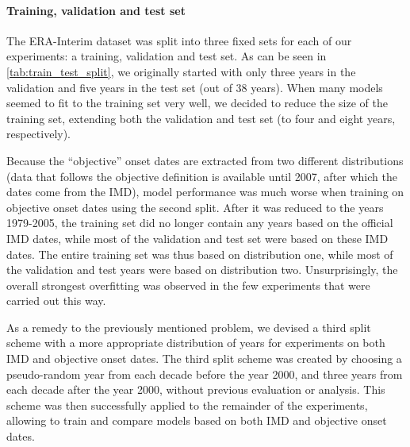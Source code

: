 \paragraph{Training, validation and test set}
The ERA-Interim dataset was split into three fixed sets for each of our experiments: a training, validation and test set. As can be seen in \cref{tab:train_test_split}, we originally started with only three years in the validation and five years in the test set (out of 38 years). When many models seemed to fit to the training set very well, we decided to reduce the size of the training set, extending both the validation and test set (to four and eight years, respectively).

Because the ``objective'' onset dates are extracted from two different distributions (data that follows the objective definition is available until 2007, after which the dates come from the IMD), model performance was much worse when training on objective onset dates using the second split. After it was reduced to the years 1979-2005, the training set did no longer contain any years based on the official IMD dates, while most of the validation and test set were based on these IMD dates. The entire training set was thus based on distribution one, while most of the validation and test years were based on distribution two. Unsurprisingly, the overall strongest overfitting was observed in the few experiments that were carried out this way.

As a remedy to the previously mentioned problem, we devised a third split scheme with a more appropriate distribution of years for experiments on both IMD and objective onset dates. The third split scheme was created by choosing a pseudo-random year from each decade before the year 2000, and three years from each decade after the year 2000, without previous evaluation or analysis. This scheme was then successfully applied to the remainder of the experiments, allowing to train and compare models based on both IMD and objective onset dates.

